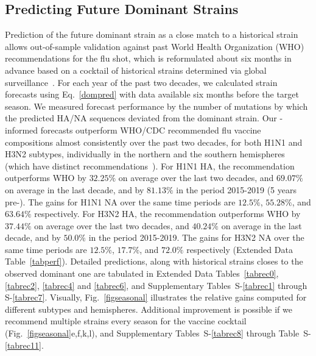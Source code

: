 \documentclass[onecolumn, compsoc,10pt]{IEEEtran}
\def\EXTENDED{Extended Data\xspace}
\def\SUPPLEMENTARY{Supplementary\xspace}
\begin{document}
\subsection*{Predicting Future Dominant Strains}
Prediction of the future dominant strain as  a close match to a historical strain  allows out-of-sample validation against past World Health Organization (WHO) recommendations for the flu shot, which  is  reformulated about six months in advance based on a  cocktail of historical strains determined via global surveillance~\cite{agor2018models}. For each year of the past two decades, we calculated strain forecasts using  Eq.~\eqref{dompred} with data available six months before the target season. We  measured forecast performance by the number of mutations by which the predicted HA/NA  sequences deviated from the  dominant strain. Our \enet-informed forecasts outperform  WHO/CDC recommended flu vaccine compositions almost consistently over the past two decades, for both H1N1 and H3N2 subtypes, individually in the northern and the southern hemispheres (which have distinct recommendations~\cite{boni2008vaccination}). For H1N1 HA, the \enet  recommendation outperforms  WHO  by $32.25\%$ on average over the last two decades, and $69.07\%$ on average in the last decade, and by $81.13\%$ in the period 2015-2019 (5 years pre-\cov). The gains for H1N1 NA over the same time periods are $12.5\%$, $55.28\%$, and $63.64\%$ respectively. For H3N2 HA, the \enet  recommendation outperforms  WHO  by $37.44\%$ on average over the last two decades, and $40.24\%$ on average in the last decade, and by $50.0\%$ in the period 2015-2019. The gains for H3N2 NA over the same time periods are $12.5\%$, $17.7\%$, and $72.0\%$ respectively (\EXTENDED Table~\ref{tabperf}). Detailed predictions, along with historical strains closes to the observed dominant one are tabulated in \EXTENDED Tables~\ref{tabrec0}, \ref{tabrec2}, \ref{tabrec4} and \ref{tabrec6}, and \SUPPLEMENTARY Tables~S-\ref{tabrec1} through S-\ref{tabrec7}. Visually, Fig.~\ref{figseasonal} illustrates the relative gains computed for different subtypes and hemispheres. Additional improvement is possible if we recommend multiple strains every season for the vaccine cocktail (Fig.~\ref{figseasonal}e,f,k,l), and  \SUPPLEMENTARY  Tables~S-\ref{tabrec8} through  Table~S-\ref{tabrec11}.  %
\end{document}
